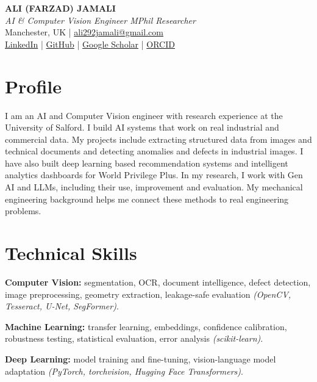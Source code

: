 \documentclass[10pt,a4paper]{article}
\renewcommand{\normalsize}{\fontsize{10pt}{14pt}\selectfont}
\let\cvOriginalTextbf\textbf
\renewcommand{\textbf}[1]{{\fontsize{10.5pt}{14pt}\selectfont\cvOriginalTextbf{#1}}}
\begin{document}
\begin{center}
  {\fontsize{15pt}{18pt}\selectfont\bfseries ALI {\color{nameaccent}(FARZAD)} JAMALI}\\[2pt]
  {\normalsize\itshape AI \& Computer Vision Engineer \textbar{} MPhil
Researcher}\\[3pt]
  Manchester, UK |
  \href{mailto:ali292jamali@gmail.com}{ali292jamali@gmail.com}\\[2pt]
  \href{https://www.linkedin.com/in/alifarzadjamali/}{LinkedIn} | \href{https://github.com/alifarzadjamali}{GitHub} | \href{https://scholar.google.com/citations?hl=en\&user=xd6LP18AAAAJ}{Google
Scholar} | \href{https://orcid.org/0009-0001-0678-4155}{ORCID}

\end{center}

\section{Profile}\label{profile}

I am an AI and Computer Vision engineer with research experience at the
University of Salford. I build AI systems that work on real industrial
and commercial data. My projects include extracting structured data from
images and technical documents and detecting anomalies and defects in
industrial images. I have also built deep learning based recommendation
systems and intelligent analytics dashboards for World Privilege Plus.
In my research, I work with Gen AI and LLMs, including their use,
improvement and evaluation. My mechanical engineering background helps
me connect these methods to real engineering problems.

\section{Technical Skills}\label{technical-skills}

\textbf{Computer Vision:} segmentation, OCR, document intelligence,
defect detection, image preprocessing, geometry extraction, leakage-safe
evaluation \emph{(OpenCV, Tesseract, U-Net, SegFormer)}.

\textbf{Machine Learning:} transfer learning, embeddings, confidence
calibration, robustness testing, statistical evaluation, error analysis
\emph{(scikit-learn)}.

\textbf{Deep Learning:} model training and fine-tuning, vision-language
model adaptation \emph{(PyTorch, torchvision, Hugging Face
Transformers)}.
\end{document}
